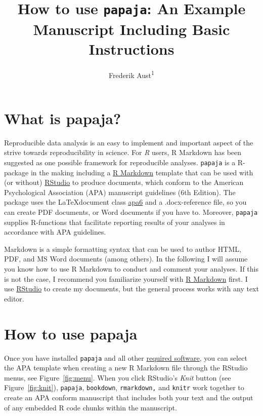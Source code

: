 \documentclass[
  man,floatsintext]{apa6}
\title{How to use \texttt{papaja}: An Example Manuscript Including Basic Instructions}
\author{Frederik Aust\textsuperscript{1}}
\date{}
\affiliation{\vspace{0.5cm}\textsuperscript{1} University of Cologne}
\begin{document}
\maketitle

\section{What is papaja?}\label{what-is-papaja}

Reproducible data analysis is an easy to implement and important aspect of the strive towards reproducibility in science.
For \emph{R} users, R Markdown has been suggested as one possible framework for reproducible analyses.
\texttt{papaja} is a R-package in the making including a \href{https://rmarkdown.rstudio.com/}{R Markdown} template that can be used with (or without) \href{https://posit.co/}{RStudio} to produce documents, which conform to the American Psychological Association (APA) manuscript guidelines (6th Edition).
The package uses the \LaTeX document class \href{https://www.ctan.org/pkg/apa6}{apa6} and a .docx-reference file, so you can create PDF documents, or Word documents if you have to.
Moreover, \texttt{papaja} supplies R-functions that facilitate reporting results of your analyses in accordance with APA guidelines.

Markdown is a simple formatting syntax that can be used to author HTML, PDF, and MS Word documents (among others).
In the following I will assume you know how to use R Markdown to conduct and comment your analyses.
If this is not the case, I recommend you familiarize yourself with \href{https://rmarkdown.rstudio.com/}{R Markdown} first.
I use \href{https://posit.co/}{RStudio} to create my documents, but the general process works with any text editor.

\section{How to use papaja}\label{how-to-use-papaja}

Once you have installed \texttt{papaja} and all other \href{https://github.com/crsh/papaja\#requirements}{required software}, you can select the APA template when creating a new R Markdown file through the RStudio menus, see Figure~\ref{fig:menu}.
When you click RStudio's \emph{Knit} button (see Figure~\ref{fig:knit}), \texttt{papaja}, \texttt{bookdown}, \texttt{rmarkdown,} and \texttt{knitr} work together to create an APA conform manuscript that includes both your text and the output of any embedded R code chunks within the manuscript.
\end{document}
